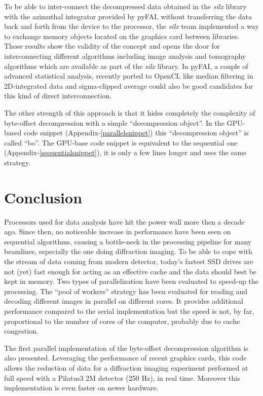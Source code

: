\documentclass[preprint]{iucr}              %
\begin{document}
To be able to inter-connect the decompressed data obtained in the \textit{silx}
library with the azimuthal integrator provided by pyFAI, without transferring the data
back and forth from the device to the processor, the \textit{silx} team implemented a
way to exchange memory objects located on the graphics card between libraries. 
Those results show the validity of the concept and opens the door for
interconnecting different algorithms including image analysis and
tomography algorithms which are available as part of the \textit{silx} library.
In pyFAI, a couple of advanced statistical analysis, recently ported to
OpenCL like median filtering in 2D-integrated data and sigma-clipped
average could also be good candidates for this kind of direct interconnection.

The other strength of this approach is that it hides completely the
complexity of byte-offset decompression with a simple ``decompression object''.
In the GPU-based code snippet (Appendix-\ref{parallelsnippet}) this ``decompression object'' is called ``bo''.
The GPU-base code snippet is equivalent to the sequential one (Appendix-\ref{sequentialsnippet}), it is only a few lines longer and uses the same strategy.

\section{Conclusion}

Processors used for data analysis have hit the power wall more then
a  decade ago.
Since then, no noticeable increase in performance have been seen on
sequential algorithms, causing a bottle-neck in the processing
pipeline for many beamlines, especially the one doing diffraction imaging.
To be able to cope with the stream of data coming from modern detector,
today's fastest SSD drives are not (yet) fast  enough for acting as an
effective cache and the data should best be kept in memory.
Two types of parallelization have been evaluated to speed-up the processing.
The ``pool of workers'' strategy has been evaluated for reading and decoding
different images  in parallel on different cores.
It provides additional performance compared to the serial implementation but
the speed is not, by far, proportional to the number of cores of the computer,
probably due to cache congestion.

The first parallel implementation of the byte-offset decompression
algorithm is also presented.
Leveraging the performance of recent graphics cards, this code allows the reduction
of data for a diffraction imaging experiment performed at full speed with
a Pilatus3 2M detector (250 Hz), in real time.
Moreover this implementation is even faster on newer hardware.
\end{document}
